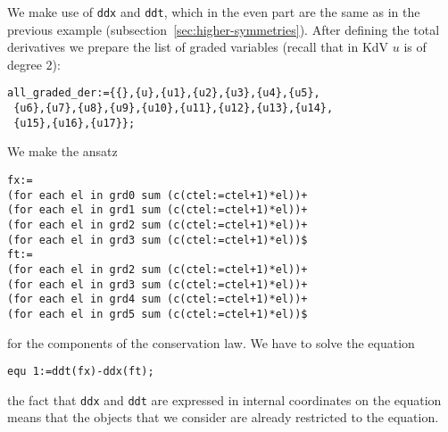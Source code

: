 We make use of \texttt{ddx} and \texttt{ddt}, which in the even part are the
same as in the previous example (subsection~\ref{sec:higher-symmetries}).
After defining the total derivatives we prepare the list of graded variables
(recall that in KdV $u$ is of degree $2$):
\begin{verbatim}
all_graded_der:={{},{u},{u1},{u2},{u3},{u4},{u5},
 {u6},{u7},{u8},{u9},{u10},{u11},{u12},{u13},{u14},
 {u15},{u16},{u17}};
\end{verbatim}
We make the ansatz
\begin{verbatim}
fx:=
(for each el in grd0 sum (c(ctel:=ctel+1)*el))+
(for each el in grd1 sum (c(ctel:=ctel+1)*el))+
(for each el in grd2 sum (c(ctel:=ctel+1)*el))+
(for each el in grd3 sum (c(ctel:=ctel+1)*el))$
ft:=
(for each el in grd2 sum (c(ctel:=ctel+1)*el))+
(for each el in grd3 sum (c(ctel:=ctel+1)*el))+
(for each el in grd4 sum (c(ctel:=ctel+1)*el))+
(for each el in grd5 sum (c(ctel:=ctel+1)*el))$
\end{verbatim}
for the components of the conservation law. We have to solve the equation
\begin{verbatim}
equ 1:=ddt(fx)-ddx(ft);
\end{verbatim}
the fact that \texttt{ddx} and \texttt{ddt} are expressed in internal
coordinates on the equation means that the objects that we consider are already
restricted to the equation.

